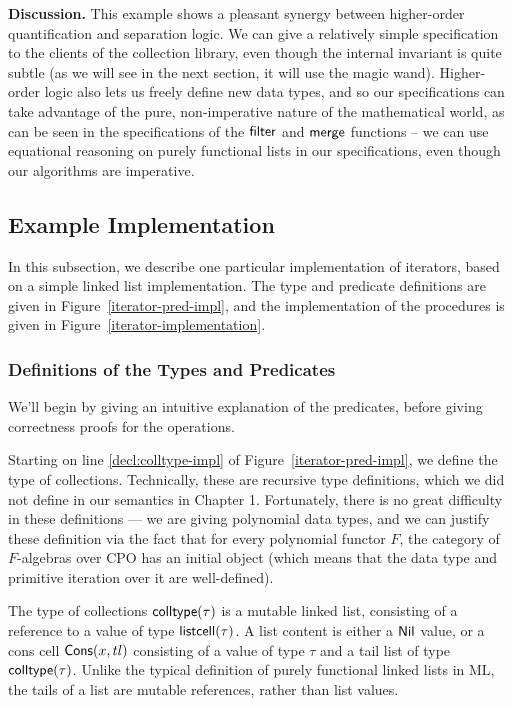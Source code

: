 \textbf{Discussion.} This example shows a pleasant synergy between
higher-order quantification and separation logic. We can give a
relatively simple specification to the clients of the collection
library, even though the internal invariant is quite subtle (as we
will see in the next section, it will use the magic wand). Higher-order
logic also lets us freely define new data types, and so our
specifications can take advantage of the pure, non-imperative nature
of the mathematical world, as can be seen in the specifications of the
$\mathsf{filter}$ and $\mathsf{merge}$ functions -- we can use equational
reasoning on purely functional lists in our specifications, even
though our algorithms are imperative.


\subsection{Example Implementation}

In this subsection, we describe one particular implementation of
iterators, based on a simple linked list implementation. The type and
predicate definitions are given in Figure~\ref{iterator-pred-impl},
and the implementation of the procedures is given in
Figure~\ref{iterator-implementation}. 


\subsubsection{Definitions of the Types and Predicates}

We'll begin by giving an intuitive explanation of the predicates,
before giving correctness proofs for the operations.

Starting on line \ref{decl:colltype-impl} of
Figure~\ref{iterator-pred-impl}, we define the type of
collections. Technically, these are recursive type definitions, which
we did not define in our semantics in Chapter 1. Fortunately, there is
no great difficulty in these definitions --- we are giving polynomial
data types, and we can justify these definition via the fact that for
every polynomial functor $F$, the category of $F$-algebras over CPO
has an initial object (which means that the data type and primitive
iteration over it are well-defined).

The type of collections $\mathsf{colltype}(\tau)$ is a mutable linked list,
consisting of a reference to a value of type $\mathsf{listcell}(\tau)$. A
list content is either a $\mathsf{Nil}$ value, or a cons cell $\mathsf{Cons}(x, tl)$
consisting of a value of type $\tau$ and a tail list of type
$\mathsf{colltype}(\tau)$. Unlike the typical definition of purely functional
linked lists in ML, the tails of a list are mutable references, rather
than list values.

